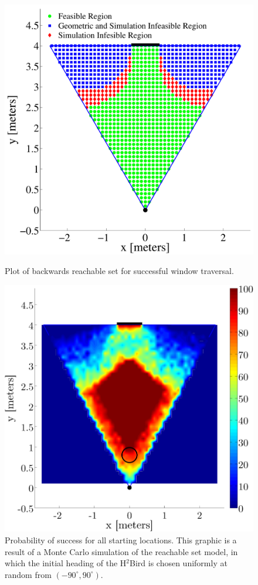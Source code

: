 \documentclass{aamas2013}
\begin{document}
\begin{figure}[tb]
\begin{minipage}[t]{0.45\linewidth}
\includegraphics[width=\textwidth]{figures/feasible_set.pdf}
\caption{Plot of backwards reachable set for successful window traversal.}
\label{fig:feasible_set}
\end{minipage}
\hfill
\begin{minipage}[t]{0.47\linewidth}
\centering
\centering
\includegraphics[width=\textwidth]{figures/heat_map.png}
\caption{Probability of success for all starting locations. This graphic is 
a result of a Monte Carlo simulation of the reachable set model, in which the 
initial heading of the H$^2$Bird is chosen uniformly at random from $(-90^{\circ},90^{\circ})$.}
\label{fig:heat_map}
\end{minipage}
\end{figure}
\end{document}
